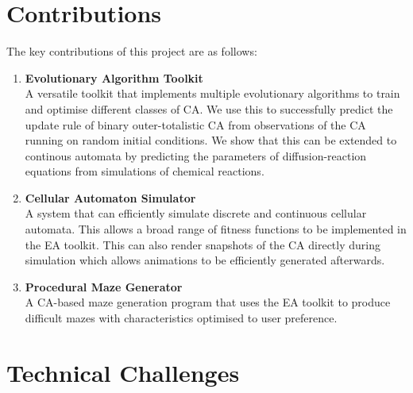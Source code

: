 \section{Contributions}
The key contributions of this project are as follows:
\begin{enumerate}
    \item \textbf{Evolutionary Algorithm Toolkit}\\ A versatile toolkit that implements multiple evolutionary algorithms to train and optimise different classes of CA. We use this to successfully predict the update rule of binary outer-totalistic CA from observations of the CA running on random initial conditions. We show that this can be extended to continous automata by predicting the parameters of diffusion-reaction equations from simulations of chemical reactions.
    \item \textbf{Cellular Automaton Simulator}\\ A system that can efficiently simulate discrete and continuous cellular automata. This allows a broad range of fitness functions to be implemented in the EA toolkit. This can also render snapshots of the CA directly during simulation which allows animations to be efficiently generated afterwards.
    \item \textbf{Procedural Maze Generator}\\ A CA-based maze generation program that uses the EA toolkit to produce difficult mazes with characteristics optimised to user preference.
    
\end{enumerate}
\section{Technical Challenges}
